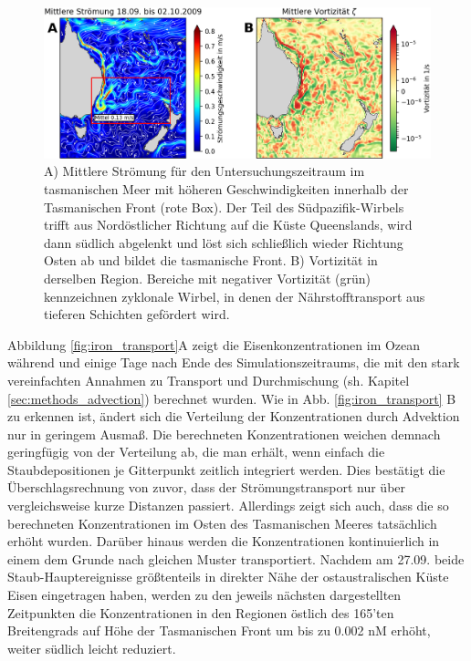 \documentclass[12pt,a4paper,onecolumn]{scrartcl}
\begin{document}
\begin{figure}
\includegraphics[width=\textwidth]{bilder/currents_mean.png}
\caption{A) Mittlere Strömung für den Untersuchungszeitraum im tasmanischen Meer mit höheren Geschwindigkeiten innerhalb der Tasmanischen Front (rote Box). Der Teil des Südpazifik-Wirbels trifft aus Nordöstlicher Richtung auf die Küste Queenslands, wird dann südlich abgelenkt und löst sich schließlich wieder Richtung Osten ab und bildet die tasmanische Front. B) Vortizität in derselben Region. Bereiche mit negativer Vortizität (grün) kennzeichnen zyklonale Wirbel, in denen der Nährstofftransport aus tieferen Schichten gefördert wird. } \label{fig:tasman_current}
\end{figure}
Abbildung \ref{fig:iron_transport}A zeigt die Eisenkonzentrationen im Ozean während und einige Tage nach Ende des Simulationszeitraums, die mit den stark vereinfachten Annahmen zu Transport und Durchmischung (sh. Kapitel \ref{sec:methods_advection}) berechnet wurden. Wie in Abb. \ref{fig:iron_transport} B zu erkennen ist, ändert sich die Verteilung der Konzentrationen durch Advektion nur in geringem Ausmaß. Die berechneten Konzentrationen weichen demnach geringfügig  von der Verteilung ab, die man erhält, wenn einfach die Staubdepositionen je Gitterpunkt zeitlich integriert werden. Dies bestätigt die Überschlagsrechnung von zuvor, dass der Strömungstransport nur über vergleichsweise kurze Distanzen passiert. Allerdings zeigt sich auch, dass die so berechneten Konzentrationen im Osten des Tasmanischen Meeres tatsächlich erhöht wurden. Darüber hinaus werden die Konzentrationen kontinuierlich in einem dem Grunde nach gleichen Muster transportiert. Nachdem am 27.09. beide Staub-Hauptereignisse größtenteils in direkter Nähe der ostaustralischen Küste Eisen eingetragen haben, werden zu den jeweils nächsten dargestellten Zeitpunkten die Konzentrationen in den Regionen östlich des 165'ten Breitengrads auf Höhe der Tasmanischen Front um bis zu 0.002 nM erhöht, weiter südlich leicht reduziert. \\
\end{document}
